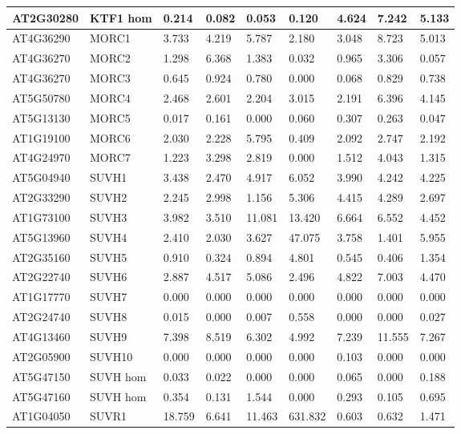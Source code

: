 \begin{landscape}
\begin{longtable}{l|l|llll|lll}
AT2G30280 & KTF1 hom & 0.214  & 0.082  & 0.053  & 0.120   & 4.624  & 7.242  & 5.133  \\ \hline
AT4G36290 & MORC1    & 3.733  & 4.219  & 5.787  & 2.180   & 3.048  & 8.723  & 5.013  \\
AT4G36270 & MORC2    & 1.298  & 6.368  & 1.383  & 0.032   & 0.965  & 3.306  & 0.057  \\
AT4G36270 & MORC3    & 0.645  & 0.924  & 0.780  & 0.000   & 0.068  & 0.829  & 0.738  \\
AT5G50780 & MORC4    & 2.468  & 2.601  & 2.204  & 3.015   & 2.191  & 6.396  & 4.145  \\
AT5G13130 & MORC5    & 0.017  & 0.161  & 0.000  & 0.060   & 0.307  & 0.263  & 0.047  \\
AT1G19100 & MORC6    & 2.030  & 2.228  & 5.795  & 0.409   & 2.092  & 2.747  & 2.192  \\
AT4G24970 & MORC7    & 1.223  & 3.298  & 2.819  & 0.000   & 1.512  & 4.043  & 1.315  \\ \hline
AT5G04940 & SUVH1    & 3.438  & 2.470  & 4.917  & 6.052   & 3.990  & 4.242  & 4.225  \\
AT2G33290 & SUVH2    & 2.245  & 2.998  & 1.156  & 5.306   & 4.415  & 4.289  & 2.697  \\
AT1G73100 & SUVH3    & 3.982  & 3.510  & 11.081 & 13.420  & 6.664  & 6.552  & 4.452  \\
AT5G13960 & SUVH4    & 2.410  & 2.030  & 3.627  & 47.075  & 3.758  & 1.401  & 5.955  \\
AT2G35160 & SUVH5    & 0.910  & 0.324  & 0.894  & 4.801   & 0.545  & 0.406  & 1.354  \\
AT2G22740 & SUVH6    & 2.887  & 4.517  & 5.086  & 2.496   & 4.822  & 7.003  & 4.470  \\
AT1G17770 & SUVH7    & 0.000  & 0.000  & 0.000  & 0.000   & 0.000  & 0.000  & 0.000  \\
AT2G24740 & SUVH8    & 0.015  & 0.000  & 0.007  & 0.558   & 0.000  & 0.000  & 0.027  \\
AT4G13460 & SUVH9    & 7.398  & 8.519  & 6.302  & 4.992   & 7.239  & 11.555 & 7.267  \\
AT2G05900 & SUVH10   & 0.000  & 0.000  & 0.000  & 0.000   & 0.103  & 0.000  & 0.000  \\
AT5G47150 & SUVH hom & 0.033  & 0.022  & 0.000  & 0.000   & 0.065  & 0.000  & 0.188  \\
AT5G47160 & SUVH hom & 0.354  & 0.131  & 1.544  & 0.000   & 0.293  & 0.105  & 0.695  \\ \hline
AT1G04050 & SUVR1    & 18.759 & 6.641  & 11.463 & 631.832 & 0.603  & 0.632  & 1.471  \\

\end{longtable}
\end{landscape}

